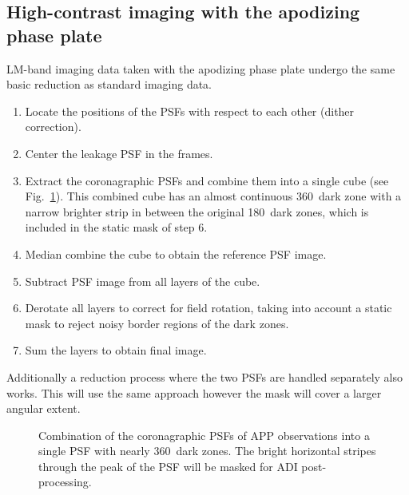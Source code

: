 \subsection{High-contrast imaging with the apodizing phase plate}
\label{ssec:algo_app_imaging}

LM-band imaging data taken with the apodizing phase plate undergo the
same basic reduction as standard imaging data. %



\begin{enumerate}
\item Locate the positions of the PSFs with respect to each other
  (dither correction).
\item Center the leakage PSF in the frames.
\item Extract the coronagraphic PSFs and combine them into a single
  cube (see Fig.~\ref{fig:app_psf_combine}). This combined cube has an almost continuous 
  360\degr\ dark zone with a narrow brighter strip in between the original 180\degr\ dark zones, which is included in the static mask of step 6.
\item Median combine the cube to obtain the reference PSF image.
\item Subtract PSF image from all layers of the cube.
\item Derotate all layers to correct for field rotation, taking into
  account a static mask to reject noisy border regions of the dark
  zones.
\item Sum the layers to obtain final image.
\end{enumerate}

Additionally a reduction process where the two PSFs are handled separately also works. This will use the same approach however the mask will cover a larger angular extent.

\begin{figure}
  \centering
    \caption[Combination of the coronagraphic PSFs of APP observations into a single PSF]{%
        Combination of the coronagraphic PSFs of APP observations
        into a single PSF with nearly 360\degr\ dark zones. The bright
        horizontal stripes through the peak of the PSF will be masked for
        ADI post-processing.}
  \label{fig:app_psf_combine}
\end{figure}


